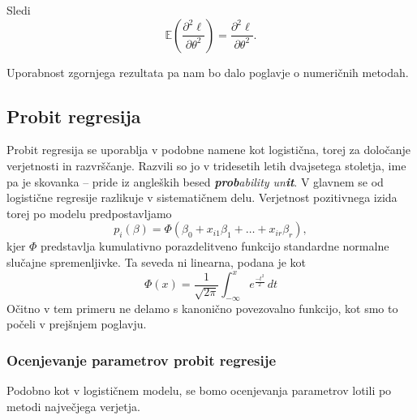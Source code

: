 \documentclass[12pt,a4paper]{amsart}
\theoremstyle{definition} %
\theoremstyle{plain} %
\begin{document}
Sledi
\begin{equation}\label{pv2odv}    
    \mathbb{E}\left(\frac{\partial^2\ell}{\partial\theta^2}\right) = \frac{\partial^2\ell}{\partial\theta^2}.
\end{equation}

Uporabnost zgornjega rezultata pa nam bo dalo poglavje o numeričnih metodah.

%
\subsection{Probit regresija}
Probit regresija se uporablja v podobne namene kot logistična, torej za določanje verjetnosti in razvrščanje. Razvili so jo v tridesetih letih
dvajsetega stoletja, ime pa je skovanka -- pride iz angleških besed \textit{\textbf{prob}ability un\textbf{it}}. V glavnem se od logistične regresije
razlikuje v sistematičnem delu. Verjetnost pozitivnega izida torej po modelu predpostavljamo
\begin{equation}
    p_{i}(\beta) = \Phi (\beta_{0} + x_{i1}\beta_{1} + \ldots + x_{ir}\beta_{r}),
\end{equation}
kjer $\Phi$ predstavlja kumulativno porazdelitveno funkcijo standardne normalne slučajne spremenljivke. Ta seveda ni linearna,
podana je kot 
\[
    \Phi(x) = \frac{1}{\sqrt{2\pi}}\int_{-\infty}^{x}e^{\frac{-t^2}{2}}\,dt
\]
Očitno v tem primeru ne delamo s kanonično povezovalno funkcijo, kot smo to počeli v prejšnjem poglavju.

\subsubsection{Ocenjevanje parametrov probit regresije}\label{ocenpar_probit}
Podobno kot v logističnem modelu, se bomo ocenjevanja parametrov lotili po metodi največjega verjetja. 
\end{document}
